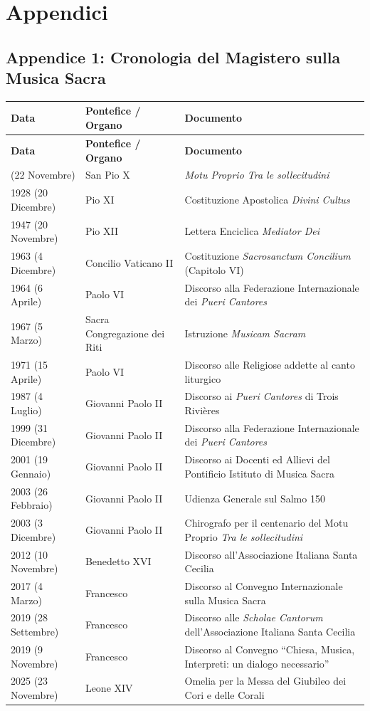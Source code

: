 \documentclass[12pt,a4paper]{article}
\begin{document}
	\section{Appendici}\label{appendici}
	
	\subsection{Appendice 1: Cronologia del Magistero sulla Musica Sacra}\label{appendice-1-cronologia-del-magistero-sulla-musica-sacra}
	
	\begin{longtable}{L{3cm}L{4.5cm}L{7cm}}
		\toprule
		\textbf{Data} & \textbf{Pontefice / Organo} & \textbf{Documento} \\
		\midrule
		\endfirsthead
		\toprule
		\textbf{Data} & \textbf{Pontefice / Organo} & \textbf{Documento} \\
		\midrule
		\endhead
		\bottomrule
		 (22 Novembre) & San Pio X & \emph{Motu Proprio Tra le sollecitudini} \\
		1928 (20 Dicembre) & Pio XI & Costituzione Apostolica \emph{Divini Cultus} \\
		1947 (20 Novembre) & Pio XII & Lettera Enciclica \emph{Mediator Dei} \\
		1963 (4 Dicembre) & Concilio Vaticano II & Costituzione \emph{Sacrosanctum Concilium} (Capitolo VI) \\
		1964 (6 Aprile) & Paolo VI & Discorso alla Federazione Internazionale dei \emph{Pueri Cantores} \\
		1967 (5 Marzo) & Sacra Congregazione dei Riti & Istruzione \emph{Musicam Sacram} \\
		1971 (15 Aprile) & Paolo VI & Discorso alle Religiose addette al canto liturgico \\
		1987 (4 Luglio) & Giovanni Paolo II & Discorso ai \emph{Pueri Cantores} di Trois Rivières \\
		1999 (31 Dicembre) & Giovanni Paolo II & Discorso alla Federazione Internazionale dei \emph{Pueri Cantores} \\
		2001 (19 Gennaio) & Giovanni Paolo II & Discorso ai Docenti ed Allievi del Pontificio Istituto di Musica Sacra \\
		2003 (26 Febbraio) & Giovanni Paolo II & Udienza Generale sul Salmo 150 \\
		2003 (3 Dicembre) & Giovanni Paolo II & Chirografo per il centenario del Motu Proprio \emph{Tra le sollecitudini} \\
		2012 (10 Novembre) & Benedetto XVI & Discorso all'Associazione Italiana Santa Cecilia \\
		2017 (4 Marzo) & Francesco & Discorso al Convegno Internazionale sulla Musica Sacra \\
		2019 (28 Settembre) & Francesco & Discorso alle \emph{Scholae Cantorum} dell'Associazione Italiana Santa Cecilia \\
		2019 (9 Novembre) & Francesco & Discorso al Convegno ``Chiesa, Musica, Interpreti: un dialogo necessario'' \\
		2025 (23 Novembre) & Leone XIV & Omelia per la Messa del Giubileo dei Cori e delle Corali \\
	\end{longtable}
	
\end{document}
